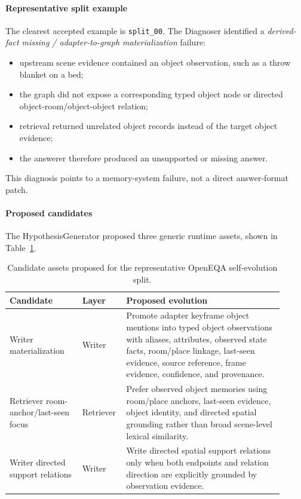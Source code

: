 \paragraph{Representative split example}
The clearest accepted example is \texttt{split\_00}.
The Diagnoser identified a \textit{derived-fact missing / adapter-to-graph materialization} failure:
\begin{itemize}
    \item upstream scene evidence contained an object observation, such as a throw blanket on a bed;
    \item the graph did not expose a corresponding typed object node or directed object-room/object-object relation;
    \item retrieval returned unrelated object records instead of the target object evidence;
    \item the answerer therefore produced an unsupported or missing answer.
\end{itemize}
This diagnosis points to a memory-system failure, not a direct answer-format patch.

\paragraph{Proposed candidates}
The HypothesisGenerator proposed three generic runtime assets, shown in Table~\ref{tab:split00_self_evo_candidates}.

\begin{table}[t]
\centering
\small
\begin{tabular}{p{0.25\linewidth} p{0.12\linewidth} p{0.54\linewidth}}
\hline
\textbf{Candidate} & \textbf{Layer} & \textbf{Proposed evolution} \\
\hline
Writer materialization
& Writer
& Promote adapter keyframe object mentions into typed object observations with aliases, attributes, observed state facts, room/place linkage, last-seen evidence, source reference, frame evidence, confidence, and provenance. \\
Retriever room-anchor/last-seen focus
& Retriever
& Prefer observed object memories using room/place anchors, last-seen evidence, object identity, and directed spatial grounding rather than broad scene-level lexical similarity. \\
Writer directed support relations
& Writer
& Write directed spatial support relations only when both endpoints and relation direction are explicitly grounded by observation evidence. \\
\hline
\end{tabular}
\caption{Candidate assets proposed for the representative OpenEQA self-evolution split.}
\label{tab:split00_self_evo_candidates}
\end{table}


